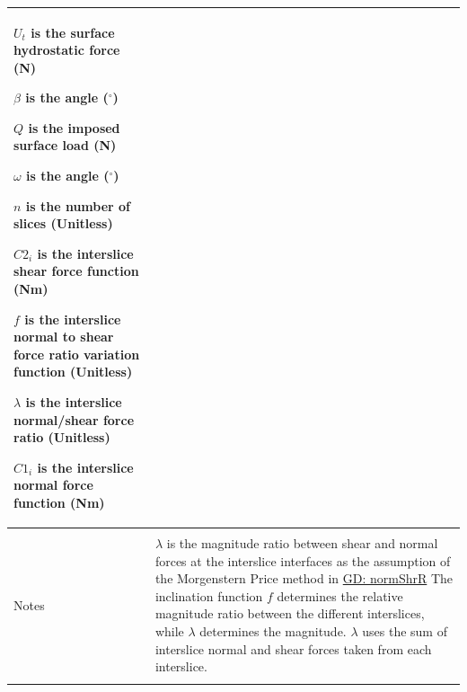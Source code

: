 \documentclass[12pt]{article}
\begin{document}
\begin{minipage}{\textwidth}
\begin{tabular}{p{} p{}}
\begin{symbDescription}
                                                                                           \item{${U_{t}}$ is the surface hydrostatic force (N)}
                                                                                           \item{$β$ is the angle (${}^{\circ}$)}
                                                                                           \item{$Q$ is the imposed surface load (N)}
                                                                                           \item{$ω$ is the angle (${}^{\circ}$)}
                                                                                           \item{$n$ is the number of slices (Unitless)}
                                                                                           \item{${C2_{i}}$ is the interslice shear force function (Nm)}
                                                                                           \item{$f$ is the interslice normal to shear force ratio variation function (Unitless)}
                                                                                           \item{$λ$ is the interslice normal/shear force ratio (Unitless)}
                                                                                           \item{${C1_{i}}$ is the interslice normal force function (Nm)}
                                                                                           \end{symbDescription}
                                                                                           \\ \midrule \\
                                                                                           Notes & $λ$ is the magnitude ratio between shear and normal forces at the interslice interfaces as the assumption of the Morgenstern Price method in \hyperref[GD:normShrR]{GD: normShrR} The inclination function $f$ determines the relative magnitude ratio between the different interslices, while $λ$ determines the magnitude. $λ$ uses the sum of interslice normal and shear forces taken from each interslice.
                                                                                                   \\ \midrule \\

\end{tabular}
\end{minipage}
\end{document}

